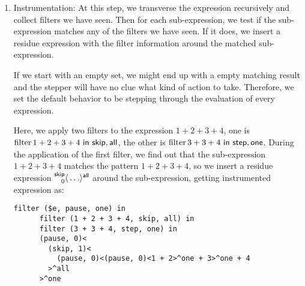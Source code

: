 \begin{enumerate}
  \item Instrumentation: At this step, we transverse the expression recursively
    and collect filters we have seen. Then for each sub-expression, we test
    if the sub-expression matches any of the filters we have seen. If it does,
    we insert a residue expression with the filter information around the matched
    sub-expression.

    If we start with an empty set, we might end up with a
    empty matching result and the stepper will have no clue what kind of action
    to take. Therefore, we set the default behavior to be stepping through the evaluation of every expression.

    Here, we apply two filters to the expression \(1 + 2 + 3 + 4\), one is
    \(\operatorname{filter} 1 + 2 + 3 + 4 ~\mathsf{in}~ \mathsf{skip}, \mathsf{all}\), the other is \(\operatorname{filter} 3 + 3
    + 4 ~\mathsf{in}~ \mathsf{step}, \mathsf{one}\). During the application of the first filter, we
    find out that the sub-expression \(1 + 2 + 3 + 4\) matches the pattern \(1 +
    2 + 3 + 4\), so we insert a residue expression \(\prescript{\mathsf{skip}}{0}{\langle} \ldots \rangle^{\mathsf{all}}\)
    around the sub-expression, getting instrumented expression as:
    \begin{lstlisting}[language=hazel]
      filter ($e, pause, one) in
      filter (1 + 2 + 3 + 4, skip, all) in
      filter (3 + 3 + 4, step, one) in
      (pause, 0)<
        (skip, 1)<
          (pause, 0)<(pause, 0)<1 + 2>^one + 3>^one + 4
        >^all
      >^one
    \end{lstlisting}


\end{enumerate}
